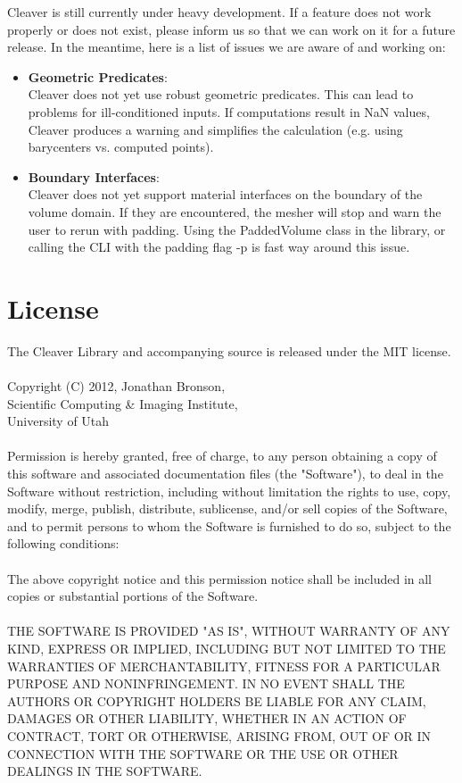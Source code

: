 \documentclass[fleqn,12pt,openany]{book}
\begin{document}
Cleaver is still currently under heavy development. If a feature
does not work properly or does not exist, please inform us so that
we can work on it for a future release. In the meantime, here is a
list of issues we are aware of and working on:


\begin{itemize}
\item \textbf{Geometric Predicates}: \\
  Cleaver does not yet use robust geometric
  predicates. This can lead to problems for ill-conditioned inputs. If
  computations result in NaN values, Cleaver produces a warning and
  simplifies the calculation (e.g. using barycenters vs. computed points).
\item \textbf{Boundary Interfaces}:  \\
  Cleaver does not yet support material interfaces on the boundary of
  the volume domain. If they are encountered, the mesher will stop and
  warn the user to rerun with padding. Using the PaddedVolume class in
  the library, or calling the CLI with the padding flag -p is fast way
  around this issue.
\end{itemize}

\appendix
\chapter{License}

The Cleaver Library and accompanying source is released under 
the MIT license.\\
\\
Copyright (C) 2012, Jonathan Bronson,\\
 Scientific Computing \& Imaging Institute,\\
 University of Utah\\
\\
 Permission is  hereby  granted, free  of charge, to any person
 obtaining a copy of this software and associated documentation
 files (the "Software"), to deal in the Software without
 restriction, including  without limitation the rights to  use,
 copy, modify,  merge, publish, distribute, sublicense,  and/or
 sell copies of the Software, and to permit persons to whom the
 Software is  furnished  to do  so,  subject  to  the following
 conditions:\\
\\
 The above  copyright notice  and  this permission notice shall
 be included  in  all copies  or  substantial  portions  of the
 Software.\\
\\
 THE SOFTWARE IS  PROVIDED  "AS IS",  WITHOUT  WARRANTY  OF ANY
 KIND,  EXPRESS OR IMPLIED, INCLUDING  BUT NOT  LIMITED  TO THE
 WARRANTIES   OF  MERCHANTABILITY,  FITNESS  FOR  A  PARTICULAR
 PURPOSE AND NONINFRINGEMENT. IN NO EVENT  SHALL THE AUTHORS OR
 COPYRIGHT HOLDERS  BE  LIABLE FOR  ANY CLAIM, DAMAGES OR OTHER
 LIABILITY, WHETHER IN AN ACTION OF CONTRACT, TORT OR OTHERWISE,
 ARISING FROM, OUT OF OR IN CONNECTION WITH THE SOFTWARE OR THE
 USE OR OTHER DEALINGS IN THE SOFTWARE.
\end{document}
